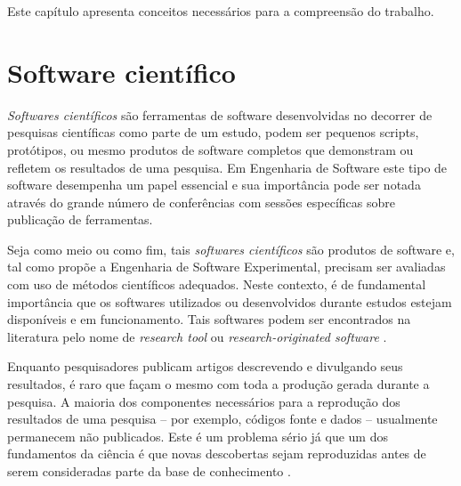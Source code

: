 
{Este capítulo apresenta conceitos necessários para a compreensão do trabalho.}
\label{fundamentacao}

\section{Software científico}

{\it Softwares científicos} são ferramentas de software desenvolvidas no decorrer de
pesquisas científicas como parte de um estudo, podem ser pequenos scripts,
protótipos, ou mesmo produtos de software completos que demonstram ou refletem
os resultados de uma pesquisa. Em Engenharia de Software este tipo de software
desempenha um papel essencial e sua importância pode ser notada através do
grande número de conferências com sessões específicas sobre publicação de
ferramentas.

Seja como meio ou como fim, tais {\it softwares científicos} são produtos de
software e, tal como propõe a Engenharia de Software Experimental, precisam
ser avaliadas com uso de métodos científicos adequados. Neste contexto, é de
fundamental importância que os softwares utilizados ou desenvolvidos durante
estudos estejam disponíveis e em funcionamento. Tais softwares podem ser
encontrados na literatura pelo nome de {\it research tool} \cite{Portillo12} ou
{\it research-originated software} \cite{Kon2011}.

Enquanto pesquisadores publicam artigos descrevendo e divulgando seus
resultados, é raro que façam o mesmo com toda a produção gerada durante a
pesquisa. A maioria dos componentes necessários para a reprodução dos
resultados de uma pesquisa -- por exemplo, códigos fonte e dados -- usualmente
permanecem não publicados. Este é um problema sério já que um dos fundamentos
da ciência é que novas descobertas sejam reproduzidas antes de serem
consideradas parte da base de conhecimento \cite{Stodden2009}.

